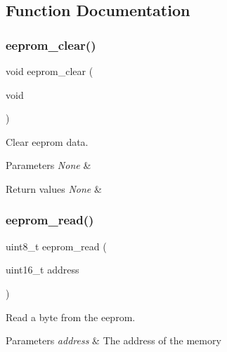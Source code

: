 \subsection{Function Documentation}
\mbox{\label{group___eeprom___trans_ga7964a5a66da1c4a59a42309a93752217}} 
\subsubsection{\texorpdfstring{eeprom\+\_\+clear()}{eeprom\_clear()}}
{\footnotesize\ttfamily void eeprom\+\_\+clear (\begin{DoxyParamCaption}\item[{void}]{ }\end{DoxyParamCaption})}



Clear eeprom data. 


\begin{DoxyParams}{Parameters}
{\em None} & \\
\hline
\end{DoxyParams}

\begin{DoxyRetVals}{Return values}
{\em None} & \\
\hline
\end{DoxyRetVals}
\mbox{\label{group___eeprom___trans_gafaa7cca6f6ad1d9ae49522324c825c2f}} 
\subsubsection{\texorpdfstring{eeprom\+\_\+read()}{eeprom\_read()}}
{\footnotesize\ttfamily uint8\+\_\+t eeprom\+\_\+read (\begin{DoxyParamCaption}\item[{uint16\+\_\+t}]{address }\end{DoxyParamCaption})}



Read a byte from the eeprom. 


\begin{DoxyParams}{Parameters}
{\em address} & The address of the memory \\
\hline
\end{DoxyParams}

